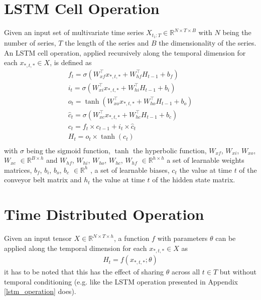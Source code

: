 \section{LSTM Cell Operation}
Given an input set of multivariate time series $X_{t_1:T} \in \mathbb{R}^{N \times T \times B}$ with $N$ being the number of series, $T$ the length of the series and $B$ the dimensionality of the series. An LSTM cell operation, applied recursively along the temporal dimension for each $x_{*,t,*} \in X$, is defined as
\begin{gather}
    \label{lstm_operation}
    f_t = \sigma(W_{xf}^\top x_{*,t,*} + W_{hf}^\top H_{t-1} + b_f) \\ \nonumber
    i_t = \sigma(W_{xi}^\top x_{*,t,*} + W_{hi}^\top H_{t-1} + b_i) \\ \nonumber
    o_t = \tanh(W_{xo}^\top x_{*,t,*} + W_{ho}^\top H_{t-1} + b_o) \\ \nonumber
    \widehat{c}_t = \sigma(W_{xc}^\top x_{*,t,*} + W_{hc}^\top H_{t-1} + b_c) \\ \nonumber
    c_t = f_t \times c_{t-1} + i_t \times \widehat{c}_t \\ \nonumber
    H_t = o_t \times \tanh(c_t) \\ \nonumber
\end{gather}
with $\sigma$  being the sigmoid function, $\tanh$ the hyperbolic function, $W_{xf}$, $W_{xi}$, $W_{xo}$, $W_{xc}$ $\in \mathbb{R}^{B \times h}$ and $W_{hf}$,  $W_{hi}$,  $W_{ho}$, $W_{hc}$, $W_{hf}$ $\in \mathbb{R}^{h \times h}$ a set of learnable weights matrices, $b_f$, $b_i$, $b_o$, $b_c$ $\in \mathbb{R}^{h}$ , a set of learnable biases, $c_t$ the value at time $t$ of the conveyor belt matrix and $h_t$ the value at time $t$ of the hidden state matrix.


\section{Time Distributed Operation}
Given an input tensor $X \in \mathbb{R}^{N \times T \times h}$, a function $f$ with parameters $\theta$ can be applied along the temporal dimension for each $x_{*,t,*} \in X$ as
\begin{gather}
    \label{time_distributed}
    H_t = f(x_{*,t,*}; \theta)
\end{gather}
it has to be noted that this has the effect of sharing $\theta$ across all $t \in T$ but without temporal conditioning (e.g. like the LSTM operation presented in Appendix \ref{lstm_operation} does).

